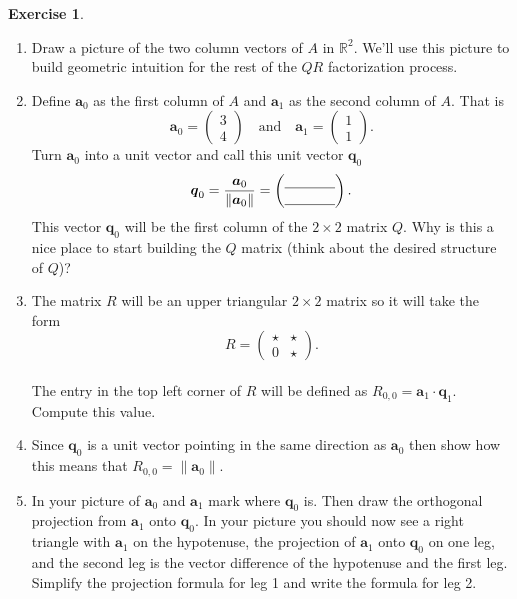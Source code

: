 \documentclass[
]{book}
\providecommand{\tightlist}{%
  \setlength{\itemsep}{0pt}\setlength{\parskip}{0pt}}
\theoremstyle{definition}
\theoremstyle{definition}
\theoremstyle{definition}
\newtheorem{exercise}{Exercise}[chapter]
\theoremstyle{remark}
\begin{document}
\begin{exercise}
\begin{enumerate}
\def\labelenumi{\alph{enumi}.}
\tightlist
\item
  Draw a picture of the two column vectors of \(A\) in \(\mathbb{R}^2\). We'll use this picture to build geometric intuition for the rest of the \(QR\) factorization process.
\item
  Define \(\boldsymbol{a}_0\) as the first column of \(A\) and \(\boldsymbol{a}_1\) as the second column of \(A\). That is
  \[ \boldsymbol{a}_0 = \begin{pmatrix} 3\\4\end{pmatrix} \quad \text{and} \quad \boldsymbol{a}_1 = \begin{pmatrix} 1\\1\end{pmatrix}. \]
  Turn \(\boldsymbol{a}_0\) into a unit vector and call this unit vector \(\boldsymbol{q}_0\)
  \[ \boldsymbol{q}_0 = \frac{\boldsymbol{a}_0}{\|\boldsymbol{a}_0\|} = \begin{pmatrix} \underline{\hspace{0.5in}} \\ \underline{\hspace{0.5in}} \end{pmatrix}. \]
  This vector \(\boldsymbol{q}_0\) will be the first column of the \(2 \times 2\) matrix \(Q\). Why is this a nice place to start building the \(Q\) matrix (think about the desired structure of \(Q\))?
\item
  The matrix \(R\) will be an upper triangular \(2 \times 2\) matrix so it will take the form
  \[ R = \begin{pmatrix} \star & \star \\ 0 & \star \end{pmatrix}.\]\\
  The entry in the top left corner of \(R\) will be defined as \(R_{0,0} = \boldsymbol{a}_1 \cdot \boldsymbol{q}_1\). Compute this value.\\
\item
  Since \(\boldsymbol{q}_0\) is a unit vector pointing in the same direction as \(\boldsymbol{a}_0\) then show how this means that \(R_{0,0} = \|\boldsymbol{a}_0\|\).
\item
  In your picture of \(\boldsymbol{a}_0\) and \(\boldsymbol{a}_1\) mark where \(\boldsymbol{q}_0\) is. Then draw the orthogonal projection from \(\boldsymbol{a}_1\) onto \(\boldsymbol{q}_0\). In your picture you should now see a right triangle with \(\boldsymbol{a}_1\) on the hypotenuse, the projection of \(\boldsymbol{a}_1\) onto \(\boldsymbol{q}_0\) on one leg, and the second leg is the vector difference of the hypotenuse and the first leg. Simplify the projection formula for leg 1 and write the formula for leg 2.\\

\end{enumerate}
\end{exercise}
\end{document}
